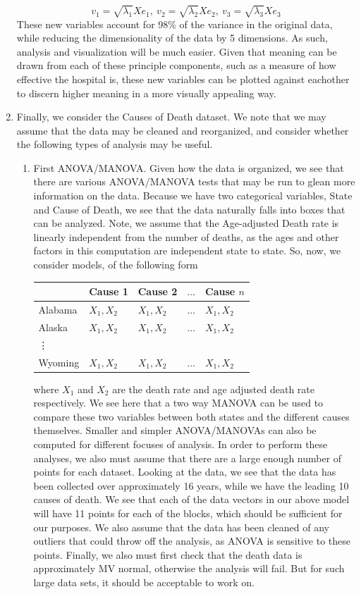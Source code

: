 \documentclass[letterpaper,10pt]{article}
\begin{document}
\begin{enumerate}
\[v_1=\sqrt{\lambda_1}Xe_1,\ v_2=\sqrt{\lambda_2}Xe_2,\ v_3=\sqrt{\lambda_3}Xe_3\]
These new variables account for 98\% of the variance in the original data, while reducing the dimensionality of the data by 5 dimensions. As such, analysis and visualization will be much easier. Given that meaning can be drawn from each of these principle components, such as a measure of how effective the hospital is, these new variables can be plotted against eachother to discern higher meaning in a more visually appealing way.
\item Finally, we consider the Causes of Death dataset. We note that we may assume that the data may be cleaned and reorganized, and consider whether the following types of analysis may be useful.
\begin{enumerate}
\item First ANOVA/MANOVA. Given how the data is organized, we see that there are various ANOVA/MANOVA tests that may be run to glean more information on the data. Because we have two categorical variables, State and Cause of Death, we see that the data naturally falls into boxes that can be analyzed. Note, we assume that the Age-adjusted Death rate is linearly independent from the number of deaths, as the ages and other factors in this computation are independent state to state. So, now, we consider models, of the following form
\begin{center}
\begin{tabular}{l|l|l|l|l|}
& Cause 1 & Cause 2 & $\ldots$ & Cause $n$\\\hline
Alabama & $X_1, X_2$ &  $X_1, X_2$ & $\ldots$ & $X_1, X_2$\\\hline
Alaska & $X_1, X_2$ &  $X_1, X_2$ & $\ldots$ & $X_1, X_2$\\\hline
\vdots &&&&\\
Wyoming & $X_1, X_2$ &  $X_1, X_2$ & $\ldots$ & $X_1, X_2$\\\hline
\end{tabular}
\end{center}
where $X_1$ and $X_2$ are the death rate and age adjusted death rate respectively. We see here that a two way MANOVA can be used to compare these two variables between both states and the different causes themselves. Smaller and simpler ANOVA/MANOVAs can also be computed for different focuses of analysis. In order to perform these analyses, we also must assume that there are a large enough number of points for each dataset. Looking at the data, we see that the data has been collected over approximately 16 years, while we have the leading 10 causes of death. We see that each of the data vectors in our above model will have 11 points for each of the blocks, which should be sufficient for our purposes. We also assume that the data has been cleaned of any outliers that could throw off the analysis, as ANOVA is sensitive to these points. Finally, we also must first check that the death data is approximately MV normal, otherwise the analysis will fail. But for such large data sets, it should be acceptable to work on.

\end{enumerate}
\end{enumerate}
\end{document}
